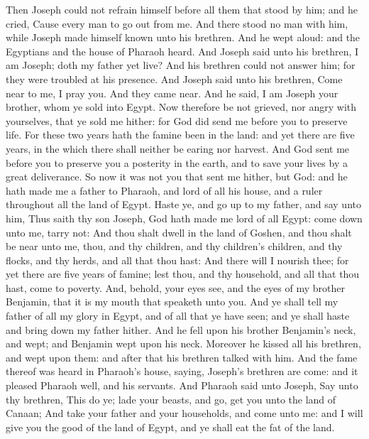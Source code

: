 \begin{biblechapter} %
 Then Joseph could not refrain himself before all them that stood by him; and he cried, Cause every man to go out from me. And there stood no man with him, while Joseph made himself known unto his brethren.
\verse And he wept aloud: and the Egyptians and the house of Pharaoh heard.
\verse And Joseph said unto his brethren, I am Joseph; doth my father yet live? And his brethren could not answer him; for they were troubled at his presence.
\verse And Joseph said unto his brethren, Come near to me, I pray you. And they came near. And he said, I am Joseph your brother, whom ye sold into Egypt.
\verse Now therefore be not grieved, nor angry with yourselves, that ye sold me hither: for God did send me before you to preserve life.
\verse For these two years hath the famine been in the land: and yet there are five years, in the which there shall neither be earing nor harvest.
\verse And God sent me before you to preserve you a posterity in the earth, and to save your lives by a great deliverance.
\verse So now it was not you that sent me hither, but God: and he hath made me a father to Pharaoh, and lord of all his house, and a ruler throughout all the land of Egypt.
\verse Haste ye, and go up to my father, and say unto him, Thus saith thy son Joseph, God hath made me lord of all Egypt: come down unto me, tarry not:
\verse And thou shalt dwell in the land of Goshen, and thou shalt be near unto me, thou, and thy children, and thy children's children, and thy flocks, and thy herds, and all that thou hast:
\verse And there will I nourish thee; for yet there are five years of famine; lest thou, and thy household, and all that thou hast, come to poverty.
\verse And, behold, your eyes see, and the eyes of my brother Benjamin, that it is my mouth that speaketh unto you.
\verse And ye shall tell my father of all my glory in Egypt, and of all that ye have seen; and ye shall haste and bring down my father hither.
\verse And he fell upon his brother Benjamin's neck, and wept; and Benjamin wept upon his neck.
\verse Moreover he kissed all his brethren, and wept upon them: and after that his brethren talked with him.
\verse And the fame thereof was heard in Pharaoh's house, saying, Joseph's brethren are come: and it pleased Pharaoh well, and his servants.
\verse And Pharaoh said unto Joseph, Say unto thy brethren, This do ye; lade your beasts, and go, get you unto the land of Canaan;
\verse And take your father and your households, and come unto me: and I will give you the good of the land of Egypt, and ye shall eat the fat of the land.

\end{biblechapter}

